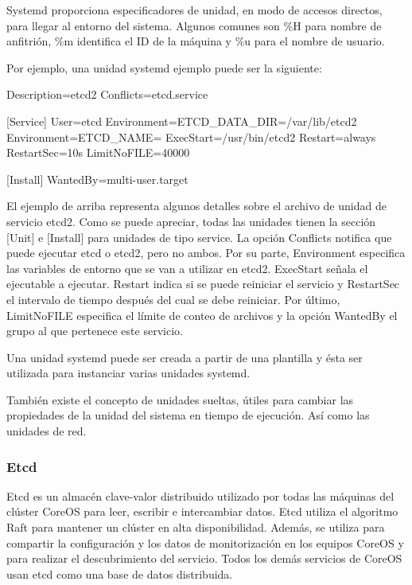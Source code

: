 Systemd proporciona especificadores de unidad, en modo de accesos directos, para llegar al entorno del sistema. Algunos comunes son \%H para nombre de anfitrión, \%m identifica el ID de la máquina y \%u para el nombre de usuario.

Por ejemplo, una unidad systemd ejemplo puede ser la siguiente:

\begin{codelisting}
\label{code:systemd}
\begin{code}
[Unit] 
Description=etcd2
Conflicts=etcd.service

[Service]
User=etcd
Environment=ETCD_DATA_DIR=/var/lib/etcd2
Environment=ETCD_NAME=%
ExecStart=/usr/bin/etcd2
Restart=always
RestartSec=10s
LimitNoFILE=40000

[Install]
WantedBy=multi-user.target
\end{code}
\end{codelisting}

El ejemplo de arriba representa algunos detalles sobre el archivo de unidad de servicio etcd2. Como se puede apreciar, todas las unidades tienen la sección [Unit] e [Install] para unidades de tipo service. La opción Conflicts notifica que puede ejecutar etcd o etcd2, pero no ambos. Por su parte, Environment especifica las variables de entorno que se van a utilizar en etcd2. ExecStart señala el ejecutable a ejecutar. Restart indica si se puede reiniciar el servicio y RestartSec el intervalo de tiempo después del cual se debe reiniciar. Por último, LimitNoFILE especifica el límite de conteo de archivos y la opción WantedBy el grupo al que pertenece este servicio.

Una unidad systemd puede ser creada a partir de una plantilla y ésta ser utilizada para instanciar varias unidades systemd.

También existe el concepto de unidades sueltas, útiles para cambiar las propiedades de la unidad del sistema en tiempo de ejecución. Así como las unidades de red.

\subsubsection{Etcd}

Etcd es un almacén clave-valor distribuido utilizado por todas las máquinas del clúster CoreOS para leer, escribir e intercambiar datos. Etcd utiliza el algoritmo Raft para mantener un clúster en alta disponibilidad. Además, se utiliza para compartir la configuración y los datos de monitorización en los equipos CoreOS y para realizar el descubrimiento del servicio. Todos los demás servicios de CoreOS usan etcd como una base de datos distribuida. 

